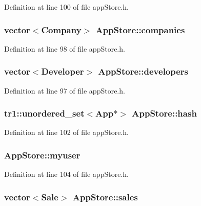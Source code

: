 Definition at line 100 of file app\-Store.\-h.

\hypertarget{class_app_store_a2e342453fb8f51b822020b21f040f042}{
\subsubsection[{companies}]{\setlength{\rightskip}{0pt plus 5cm}vector$<${\bf Company}$>$ App\-Store\-::companies}}\label{class_app_store_a2e342453fb8f51b822020b21f040f042}


Definition at line 98 of file app\-Store.\-h.

\hypertarget{class_app_store_addb4d854b56405d689398083b231bd19}{
\subsubsection[{developers}]{\setlength{\rightskip}{0pt plus 5cm}vector$<${\bf Developer}$>$ App\-Store\-::developers}}\label{class_app_store_addb4d854b56405d689398083b231bd19}


Definition at line 97 of file app\-Store.\-h.

\hypertarget{class_app_store_ab0e270b58da8babb2fddc417ab6c31ef}{
\subsubsection[{hash}]{\setlength{\rightskip}{0pt plus 5cm}tr1\-::unordered\-\_\-set$<${\bf App}$\ast$$>$ App\-Store\-::hash}}\label{class_app_store_ab0e270b58da8babb2fddc417ab6c31ef}


Definition at line 102 of file app\-Store.\-h.

\hypertarget{class_app_store_ad8dcc91d53669a6881a4b5569615d7c4}{
\subsubsection[{myuser}]{ App\-Store\-::myuser}}\label{class_app_store_ad8dcc91d53669a6881a4b5569615d7c4}


Definition at line 104 of file app\-Store.\-h.

\hypertarget{class_app_store_ab159be3e4379016bfdf1a236580253dd}{
\subsubsection[{sales}]{\setlength{\rightskip}{0pt plus 5cm}vector$<${\bf Sale}$>$ App\-Store\-::sales}}\label{class_app_store_ab159be3e4379016bfdf1a236580253dd}



